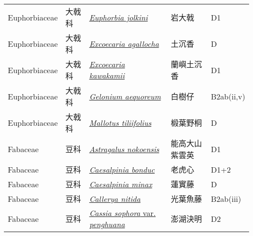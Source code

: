 {\begin{longtable}{p{2.5cm}p{2.5cm}p{4.5cm}p{2.5cm}p{3cm}}
    Euphorbiaceae & 大戟科 & \href{http://www.theplantlist.org/tpl1.1/search?q=Euphorbia+jolkini}{\textit{Euphorbia jolkini} } & 岩大戟 & D1 \index{Euphorbia@\textit{Euphorbia}!jolkini@\textit{jolkini}}  \index{岩大戟} \\
    Euphorbiaceae & 大戟科 & \href{http://www.theplantlist.org/tpl1.1/search?q=Excoecaria+agallocha}{\textit{Excoecaria agallocha} } & 土沉香 & D \index{Excoecaria@\textit{Excoecaria}!agallocha@\textit{agallocha}}  \index{土沉香} \\
    Euphorbiaceae & 大戟科 & \href{http://www.theplantlist.org/tpl1.1/search?q=Excoecaria+kawakamii}{\textit{Excoecaria kawakamii} } & 蘭嶼土沉香 & D1 \index{Excoecaria@\textit{Excoecaria}!kawakamii@\textit{kawakamii}}  \index{蘭嶼土沉香} \\
    Euphorbiaceae & 大戟科 & \href{http://www.theplantlist.org/tpl1.1/search?q=Gelonium+aequoreum}{\textit{Gelonium aequoreum} } & 白樹仔 & B2ab(ii,v) \index{Gelonium@\textit{Gelonium}!aequoreum@\textit{aequoreum}}  \index{白樹仔} \\
    Euphorbiaceae & 大戟科 & \href{http://www.theplantlist.org/tpl1.1/search?q=Mallotus+tiliifolius}{\textit{Mallotus tiliifolius} } & 椴葉野桐 & D　 \index{Mallotus@\textit{Mallotus}!tiliifolius@\textit{tiliifolius}}  \index{椴葉野桐} \\
    Fabaceae & 豆科 & \href{http://www.theplantlist.org/tpl1.1/search?q=Astragalus+nokoensis}{\textit{Astragalus nokoensis} } & 能高大山紫雲英 & D1 \index{Astragalus@\textit{Astragalus}!nokoensis@\textit{nokoensis}}  \index{能高大山紫雲英} \\
    Fabaceae & 豆科 & \href{http://www.theplantlist.org/tpl1.1/search?q=Caesalpinia+bonduc}{\textit{Caesalpinia bonduc} } & 老虎心 & D1+2 \index{Caesalpinia@\textit{Caesalpinia}!bonduc@\textit{bonduc}}  \index{老虎心} \\
    Fabaceae & 豆科 & \href{http://www.theplantlist.org/tpl1.1/search?q=Caesalpinia+minax}{\textit{Caesalpinia minax} } & 蓮實藤 & D \index{Caesalpinia@\textit{Caesalpinia}!minax@\textit{minax}}  \index{蓮實藤} \\
    Fabaceae & 豆科 & \href{http://www.theplantlist.org/tpl1.1/search?q=Callerya+nitida}{\textit{Callerya nitida} } & 光葉魚藤 & B2ab(iii) \index{Callerya@\textit{Callerya}!nitida@\textit{nitida}}  \index{光葉魚藤} \\
    Fabaceae & 豆科 & \href{http://www.theplantlist.org/tpl1.1/search?q=Cassia+sophora+var.+penghuana}{\textit{Cassia sophora} var. \textit{penghuana} } & 澎湖決明 & D2 \index{Cassia@\textit{Cassia}!sophora@\textit{sophora}!var. penghuana@var. \textit{penghuana}}  \index{澎湖決明} \\

\end{longtable}}
